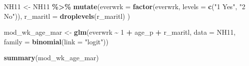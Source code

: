 \documentclass[
]{book}
\newenvironment{Shaded}{\begin{snugshade}}{\end{snugshade}}
\newcommand{\DataTypeTok}[1]{\textcolor[rgb]{0.13,0.29,0.53}{#1}}
\newcommand{\DecValTok}[1]{\textcolor[rgb]{0.00,0.00,0.81}{#1}}
\newcommand{\KeywordTok}[1]{\textcolor[rgb]{0.13,0.29,0.53}{\textbf{#1}}}
\newcommand{\NormalTok}[1]{#1}
\newcommand{\OperatorTok}[1]{\textcolor[rgb]{0.81,0.36,0.00}{\textbf{#1}}}
\newcommand{\StringTok}[1]{\textcolor[rgb]{0.31,0.60,0.02}{#1}}
\begin{document}
\begin{Shaded}
\begin{Highlighting}[]
\NormalTok{  NH11 \textless{}{-}}\StringTok{ }
\StringTok{      }\NormalTok{NH11 }\OperatorTok{\%\textgreater{}\%}
\StringTok{      }\KeywordTok{mutate}\NormalTok{(}\DataTypeTok{everwrk =} \KeywordTok{factor}\NormalTok{(everwrk, }\DataTypeTok{levels =} \KeywordTok{c}\NormalTok{(}\StringTok{"1 Yes"}\NormalTok{, }\StringTok{"2 No"}\NormalTok{)),}
             \DataTypeTok{r\_maritl =} \KeywordTok{droplevels}\NormalTok{(r\_maritl)}
\NormalTok{             )}

\NormalTok{  mod\_wk\_age\_mar \textless{}{-}}\StringTok{ }\KeywordTok{glm}\NormalTok{(everwrk }\OperatorTok{\textasciitilde{}}\StringTok{ }\DecValTok{1} \OperatorTok{+}\StringTok{ }\NormalTok{age\_p }\OperatorTok{+}\StringTok{ }\NormalTok{r\_maritl, }
                        \DataTypeTok{data =}\NormalTok{ NH11,}
                        \DataTypeTok{family =} \KeywordTok{binomial}\NormalTok{(}\DataTypeTok{link =} \StringTok{"logit"}\NormalTok{))}

  \KeywordTok{summary}\NormalTok{(mod\_wk\_age\_mar)}
\end{Highlighting}
\end{Shaded}
\end{document}
